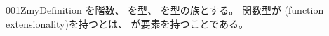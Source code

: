 \documentclass[index]{subfiles}
\begin{document}
\begin{myBlock}{001Z}{myDefinition}
  を階数、
  を型、
  を型の族とする。
  関数型が
  (function extensionality)を持つとは、
  が要素を持つことである。
\end{myBlock}
\end{document}
